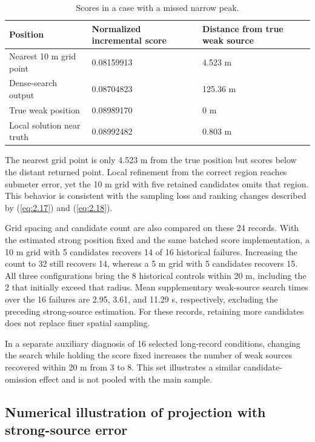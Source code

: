 \documentclass[11pt,a4paper]{article}
\numberwithin{equation}{section}
\numberwithin{figure}{section}
\numberwithin{table}{section}
\begin{document}
\begin{table}[H]
\centering
\caption{Scores in a case with a missed narrow peak.}\label{tab:3.7}
\small
\setlength{\tabcolsep}{4pt}
\renewcommand{\arraystretch}{1.2}
\begin{tabularx}{\linewidth}{Y{1.1}Y{1}Y{0.9}}
\toprule
\textbf{Position} & \textbf{Normalized incremental score} & \textbf{Distance from true weak source} \\
\midrule
Nearest 10 m grid point & 0.08159913 & 4.523 m \\
Dense-search output & 0.08704823 & 125.36 m \\
True weak position & 0.08989170 & 0 m \\
Local solution near truth & 0.08992482 & 0.803 m \\
\bottomrule
\end{tabularx}
\end{table}

The nearest grid point is only 4.523 m from the true position but scores below the distant returned point. Local refinement from the correct region reaches submeter error, yet the 10 m grid with five retained candidates omits that region. This behavior is consistent with the sampling loss and ranking changes described by (\ref{eq:2.17}) and (\ref{eq:2.18}).

Grid spacing and candidate count are also compared on these 24 records. With the estimated strong position fixed and the same batched score implementation, a 10 m grid with 5 candidates recovers 14 of 16 historical failures. Increasing the count to 32 still recovers 14, whereas a 5 m grid with 5 candidates recovers 15. All three configurations bring the 8 historical controls within 20 m, including the 2 that initially exceed that radius. Mean supplementary weak-source search times over the 16 failures are 2.95, 3.61, and 11.29 s, respectively, excluding the preceding strong-source estimation. For these records, retaining more candidates does not replace finer spatial sampling.

In a separate auxiliary diagnosis of 16 selected long-record conditions, changing the search while holding the score fixed increases the number of weak sources recovered within 20 m from 3 to 8. This set illustrates a similar candidate-omission effect and is not pooled with the main sample.

\subsection{Numerical illustration of projection with strong-source error}\label{sec:3.7}
\end{document}
